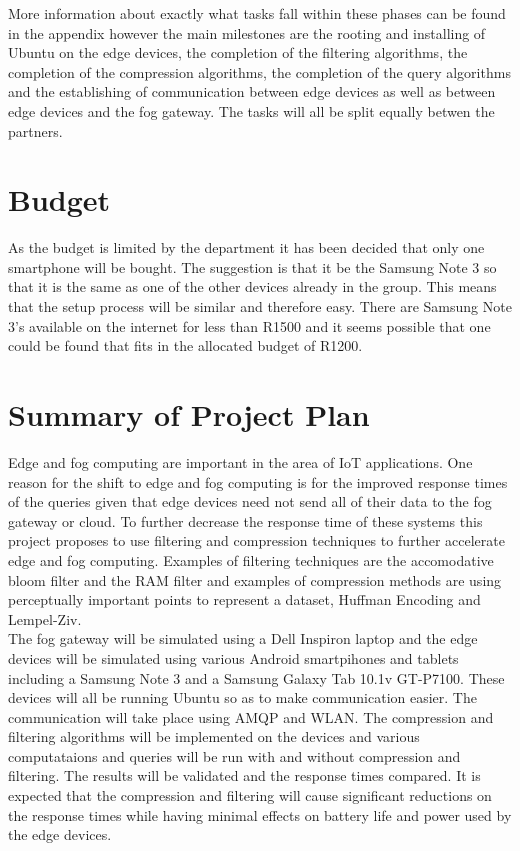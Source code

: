 \documentclass[11pt,journal, a4paper]{IEEEtran}
\begin{document}
\noindent
More information about exactly what tasks fall within these phases can be found in the appendix however the main milestones are the rooting and installing of Ubuntu on the edge devices, the completion of the filtering algorithms, the completion of the compression algorithms, the completion of the query algorithms and the establishing of communication between edge devices as well as between edge devices and the fog gateway. The tasks will all be split equally betwen the partners.


\section{Budget}
\noindent
As the budget is limited by the department it has been decided that only one smartphone will be bought. The suggestion is that it be the Samsung Note 3 so that it is the same as one of the other devices already in the group. This means that the setup process will be similar and therefore easy. There are Samsung Note 3's available on the internet for less than R1500 and it seems possible that one could be found that fits in the allocated budget of R1200.

\section{Summary of Project Plan}
\noindent
Edge and fog computing are important in the area of IoT applications. One reason for the shift to edge and fog computing is for the improved response times of the queries given that edge devices need not send all of their data to the fog gateway or cloud. To further decrease the response time of these systems this project proposes to use filtering and compression techniques to further accelerate edge and fog computing. Examples of filtering techniques are the accomodative bloom filter and the RAM filter and examples of compression methods are using perceptually important points to represent a dataset, Huffman Encoding and Lempel-Ziv. \\

\noindent
The fog gateway will be simulated using a Dell Inspiron laptop and the edge devices will be simulated using various Android smartpihones and tablets including a Samsung Note 3 and a Samsung Galaxy Tab 10.1v GT-P7100. These devices will all be running Ubuntu so as to make communication easier. The communication will take place using AMQP and WLAN. The compression and filtering algorithms will be implemented on the devices and various computataions and queries will be run with and without compression and filtering. The results will be validated and the response times compared. It is expected that the compression and filtering will cause significant reductions on the response times while having minimal effects on battery life and power used by the edge devices. \\
\end{document}
